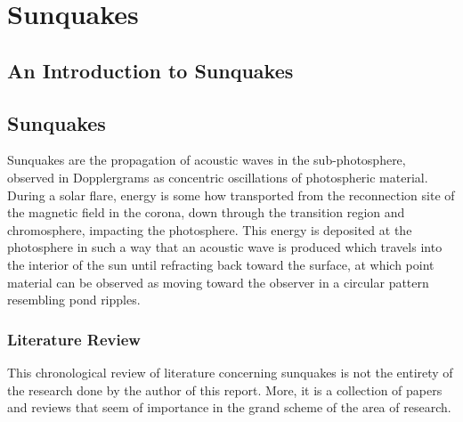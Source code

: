 \section{Sunquakes}
\subsection{An Introduction to Sunquakes}





\subsection{Sunquakes}\label{SQK}
Sunquakes are the propagation of acoustic waves in the sub-photosphere, observed in Dopplergrams as concentric oscillations of photospheric material. During a solar flare, energy is some how transported from the reconnection site of the magnetic field in the corona, down through the transition region and chromosphere, impacting the photosphere. This energy is deposited at the photosphere in such a way that an acoustic wave is produced which travels into the interior of the sun until refracting back toward the surface, at which point material can be observed as moving toward the observer in a circular pattern resembling pond ripples. 

\subsubsection{Literature Review}
This chronological review of literature concerning sunquakes is not the entirety of the research done by the author of this report. More, it is a collection of papers and reviews that seem of importance in the grand scheme of the area of research.   \\


